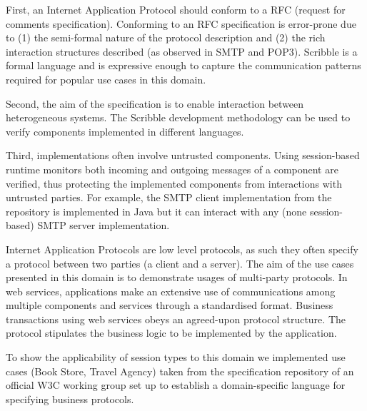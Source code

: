 First, an Internet Application Protocol should conform to a RFC (request for comments specification). Conforming to an RFC specification is error-prone due to (1) the semi-formal nature of the protocol description and (2) the rich interaction structures described (as observed in SMTP and POP3). Scribble is a formal language and is expressive enough to capture the communication patterns required for popular use cases in this domain.  

Second, the aim of the specification is to enable interaction between heterogeneous systems. The Scribble development methodology can be used to verify components implemented in different languages. 

Third, implementations often involve untrusted components. Using session-based runtime monitors both incoming and outgoing messages of a component are verified, thus protecting the implemented components from interactions with untrusted parties. For example, the SMTP client implementation from the repository is implemented in Java but it can interact with any (none session-based) SMTP server implementation.





Internet Application Protocols are low level protocols, as such they often specify a protocol between two parties (a client and a server). The aim of the use cases presented in this domain is to demonstrate usages of multi-party protocols. In web services, applications make an extensive use of communications among multiple components and services through a standardised format. Business transactions using web services
obeys an agreed-upon protocol structure. The protocol stipulates the business logic to be implemented by the application.

To show the applicability of session types to this domain we implemented use cases (Book Store, Travel Agency) taken from the specification repository of an official W3C working group set up to establish a domain-specific language for specifying business protocols.

